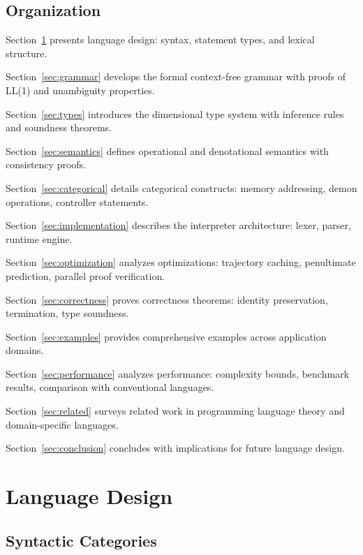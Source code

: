 \documentclass[twocolumn,10pt]{article}
\theoremstyle{definition}
\theoremstyle{remark}
\begin{document}
\subsection{Organization}

Section~\ref{sec:design} presents language design: syntax, statement types, and lexical structure.

Section~\ref{sec:grammar} develops the formal context-free grammar with proofs of LL(1) and unambiguity properties.

Section~\ref{sec:types} introduces the dimensional type system with inference rules and soundness theorems.

Section~\ref{sec:semantics} defines operational and denotational semantics with consistency proofs.

Section~\ref{sec:categorical} details categorical constructs: memory addressing, demon operations, controller statements.

Section~\ref{sec:implementation} describes the interpreter architecture: lexer, parser, runtime engine.

Section~\ref{sec:optimization} analyzes optimizations: trajectory caching, penultimate prediction, parallel proof verification.

Section~\ref{sec:correctness} proves correctness theorems: identity preservation, termination, type soundness.

Section~\ref{sec:examples} provides comprehensive examples across application domains.

Section~\ref{sec:performance} analyzes performance: complexity bounds, benchmark results, comparison with conventional languages.

Section~\ref{sec:related} surveys related work in programming language theory and domain-specific languages.

Section~\ref{sec:conclusion} concludes with implications for future language design.

\section{Language Design}
\label{sec:design}

\subsection{Syntactic Categories}
\end{document}
